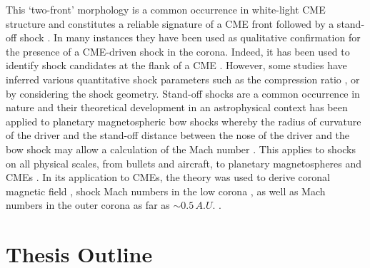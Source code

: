 This `two-front' morphology is a common occurrence in white-light CME structure and constitutes a reliable signature of a CME front followed by a stand-off shock \citep{vourlidas2013}. In many instances they have been used as qualitative confirmation for the presence of a CME-driven shock in the corona. Indeed, it has been used to identify shock candidates at the flank of a CME \citep{vourlidas2003}. However, some studies have inferred various quantitative shock parameters such as the compression ratio \citep{ontiveros2009}, or by considering the shock geometry. Stand-off shocks are a common occurrence in nature and their theoretical development in an astrophysical context has been applied to planetary magnetospheric bow shocks whereby the radius of curvature of the driver and the stand-off distance between the nose of the driver and the bow shock may allow a calculation of the Mach number \citep{spreiter1966}. This applies to shocks on all physical scales, from bullets and aircraft, to planetary magnetospheres and CMEs \citep{russel2002}. In its application to CMEs, the theory was used to derive coronal magnetic field \citep{kim2012}, shock Mach numbers in the low corona \citep{gopal2012}, as well as Mach numbers in the outer corona as far as $\sim0.5\,A.U.$ \citep{maloney2011}. 
\clearpage




\section{Thesis Outline}

